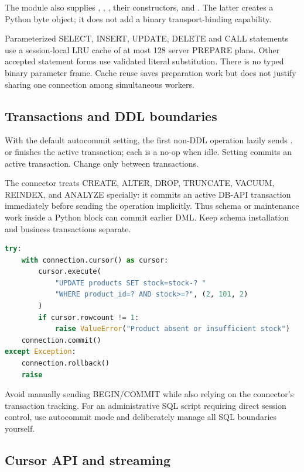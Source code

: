 The module also supplies , , , their  constructors, and . The latter creates a Python byte object; it does not add a binary transport-binding capability.

Parameterized SELECT, INSERT, UPDATE, DELETE and CALL statements use a
session-local LRU cache of at most 128 server PREPARE plans. Other accepted
statement forms use validated literal substitution. There is no typed binary
parameter frame. Cache reuse saves preparation work but does not justify
sharing one connection among simultaneous workers.

\subsection{Transactions and DDL boundaries}

With the default autocommit setting, the first non-DDL operation lazily sends .  or  finishes the active transaction; each is a no-op when idle. Setting  commits an active transaction. Change  only between transactions.

The connector treats CREATE, ALTER, DROP, TRUNCATE, VACUUM, REINDEX, and ANALYZE specially: it commits an active DB-API transaction immediately before sending the operation implicitly. Thus schema or maintenance work inside a Python  block can commit earlier DML. Keep schema installation and business transactions separate.

\begin{lstlisting}[language=Python]
try:
    with connection.cursor() as cursor:
        cursor.execute(
            "UPDATE products SET stock=stock-? "
            "WHERE product_id=? AND stock>=?", (2, 101, 2)
        )
        if cursor.rowcount != 1:
            raise ValueError("Product absent or insufficient stock")
    connection.commit()
except Exception:
    connection.rollback()
    raise
\end{lstlisting}

Avoid manually sending BEGIN/COMMIT while also relying on the connector's transaction tracking. For an administrative SQL script requiring direct session control, use autocommit mode and deliberately manage all SQL boundaries yourself.

\subsection{Cursor API and streaming}

